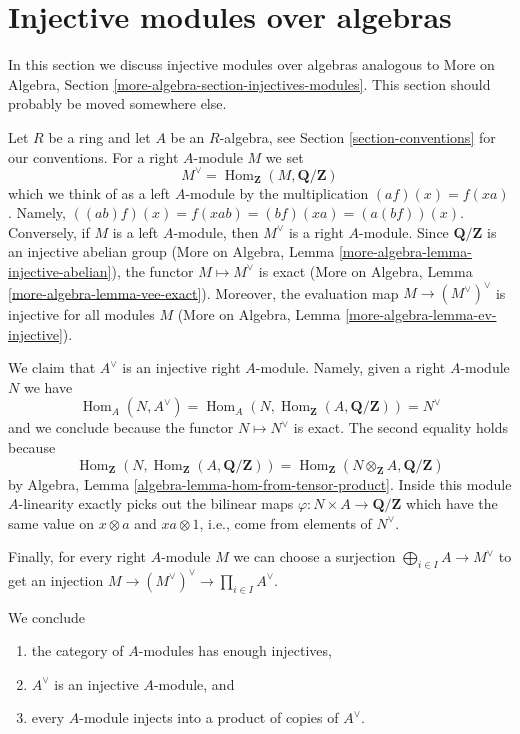 \documentclass{stacks-project}
\theoremstyle{plain}
\theoremstyle{definition}
\theoremstyle{remark}
\numberwithin{equation}{subsection}
\def\Hom{\mathop{\mathrm{Hom}}\nolimits}
\begin{document}
\section{Injective modules over algebras}
\label{section-modules-noncommutative}

\noindent
In this section we discuss injective modules over algebras
analogous to
More on Algebra, Section \ref{more-algebra-section-injectives-modules}.
This section should probably be moved somewhere else.

\medskip\noindent
Let $R$ be a ring and let $A$ be an
$R$-algebra, see Section \ref{section-conventions} for our conventions.
For a right $A$-module $M$ we set
$$
M^\vee = \Hom_\mathbf{Z}(M, \mathbf{Q}/\mathbf{Z})
$$
which we think of as a left $A$-module by the multiplication
$(a f)(x) = f(xa)$. Namely, $((ab)f)(x) = f(xab) = (bf)(xa) = (a(bf))(x)$.
Conversely, if $M$ is a left $A$-module, then $M^\vee$ is a right
$A$-module. Since $\mathbf{Q}/\mathbf{Z}$ is an injective abelian
group (More on Algebra, Lemma \ref{more-algebra-lemma-injective-abelian}), the
functor $M \mapsto M^\vee$ is exact
(More on Algebra, Lemma \ref{more-algebra-lemma-vee-exact}).
Moreover, the evaluation map $M \to (M^\vee)^\vee$ is
injective for all modules $M$
(More on Algebra, Lemma \ref{more-algebra-lemma-ev-injective}).

\medskip\noindent
We claim that $A^\vee$ is an injective right $A$-module. Namely, given
a right $A$-module $N$ we have
$$
\Hom_A(N, A^\vee) =
\Hom_A(N, \Hom_\mathbf{Z}(A, \mathbf{Q}/\mathbf{Z})) = N^\vee
$$
and we conclude because the functor $N \mapsto N^\vee$ is exact.
The second equality holds because
$$
\Hom_\mathbf{Z}(N, \Hom_\mathbf{Z}(A, \mathbf{Q}/\mathbf{Z})) =
\Hom_\mathbf{Z}(N \otimes_\mathbf{Z} A, \mathbf{Q}/\mathbf{Z})
$$
by Algebra, Lemma \ref{algebra-lemma-hom-from-tensor-product}.
Inside this module $A$-linearity exactly picks out the bilinear maps
$\varphi : N \times A \to \mathbf{Q}/\mathbf{Z}$ which
have the same value on $x \otimes a$ and $xa \otimes 1$, i.e.,
come from elements of $N^\vee$.

\medskip\noindent
Finally, for every right $A$-module $M$ we can choose a surjection
$\bigoplus_{i \in I} A \to M^\vee$ to get an injection
$M \to (M^\vee)^\vee \to \prod_{i \in I} A^\vee$.

\medskip\noindent
We conclude
\begin{enumerate}
\item the category of $A$-modules has enough injectives,
\item $A^\vee$ is an injective $A$-module, and
\item every $A$-module injects into a product of copies of $A^\vee$.
\end{enumerate}
\end{document}
